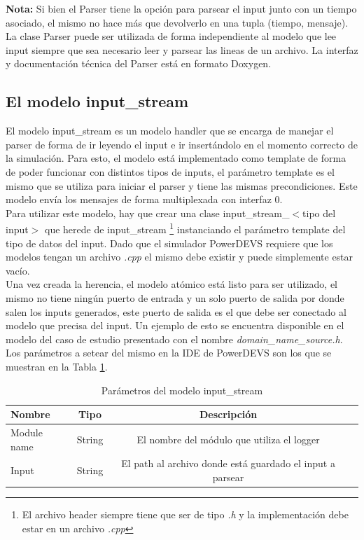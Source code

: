 \documentclass[10pt,a4paper]{article}
\begin{document}
\textbf{Nota:} Si bien el Parser tiene la opción para parsear el input junto con un tiempo asociado, el mismo no hace más que devolverlo en una tupla (tiempo, mensaje).\\

La clase Parser puede ser utilizada de forma independiente al modelo que lee input siempre que sea necesario leer y parsear las lineas de un archivo. La interfaz y documentación técnica del Parser está en formato Doxygen.

\subsection{El modelo input\_stream}

El modelo input\_stream es un modelo handler que se encarga de manejar el parser de forma de ir leyendo el input e ir insertándolo en el momento correcto de la simulación. Para esto, el modelo está implementado como template de forma de poder funcionar con distintos tipos de inputs, el parámetro template es el mismo que se utiliza para iniciar el parser y tiene las mismas precondiciones. Este modelo envía los mensajes de forma multiplexada con interfaz $0$.\\

Para utilizar este modelo, hay que crear una clase input\_stream\_$<$tipo del input$>$ que herede de input\_stream \footnote{El archivo header siempre tiene que ser de tipo \textit{.h} y la implementación debe estar en un archivo \textit{.cpp}} instanciando el parámetro template del tipo de datos del input. Dado que el simulador PowerDEVS requiere que los modelos tengan un archivo \textit{.cpp} el mismo debe existir y puede simplemente estar vacío. \\

Una vez creada la herencia, el modelo atómico está listo para ser utilizado, el mismo no tiene ningún puerto de entrada y un solo puerto de salida por donde salen los inputs generados, este puerto de salida es el que debe ser conectado al modelo que precisa del input. Un ejemplo de esto se encuentra disponible en el modelo del caso de estudio presentado con el nombre \textit{domain\_name\_source.h}. \\

Los parámetros a setear del mismo en la IDE de PowerDEVS son los que se muestran en la Tabla \ref{table: input stream parameters}.
\begin{table}[h]
\begin{tabular}{|l|c|c|c|}
  \hline
  \textbf{Nombre} & \textbf{Tipo} & \textbf{Descripción} \\
  \hline
  Module name & String & El nombre del módulo que utiliza el logger \\
  \hline
  Input & String & El path al archivo donde está guardado el input a parsear \\
  \hline
\end{tabular}
\caption{Parámetros del modelo input\_stream}
\label{table: input stream parameters}
\end{table}
\end{document}
